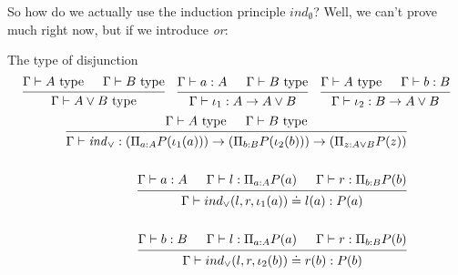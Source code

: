 \documentclass[a4paper, 12pt]{article}
\theoremstyle{changedot}
\theoremstyle{changedotbreak}
\theoremstyle{nonumberplain}
\begin{document}
So how do we actually use the induction principle $\mathit{ind}_{\emptyset}$? Well, we can't prove much right now, but if we introduce \textit{or}:

\begin{definition}
  The type of disjunction
\begin{align*}
  \begin{prooftree}
    \hypo{\Gamma \vdash A \text{ type}}
    \hypo{\Gamma \vdash B \text{ type}}
    \infer2{\Gamma \vdash A \lor B \text{ type}}
  \end{prooftree} & &
  \begin{prooftree}
    \hypo{\Gamma \vdash a : A}
    \hypo{\Gamma \vdash B \text{ type}}
    \infer2{\Gamma \vdash \iota_{1} : A \to A \lor B}
  \end{prooftree}
  &&
  \begin{prooftree}
    \hypo{\Gamma \vdash A \text{ type}}
    \hypo{\Gamma \vdash b : B}
    \infer2{\Gamma \vdash \iota_{2} : B \to A \lor B}
  \end{prooftree}
\end{align*}
\begin{align*}
  \begin{prooftree}
    \hypo{\Gamma \vdash A \text{ type}}
    \hypo{\Gamma \vdash B \text{ type}}
    \infer2{\Gamma \vdash \mathit{ind}_{\lor} : (\Pi_{a:A} P(\iota_{1}(a))) \to (\Pi_{b:B} P(\iota_{2}(b))) \to (\Pi_{z:A\lor B} P(z))}
  \end{prooftree}
  \\ \\
  \begin{prooftree}
    \hypo{\Gamma \vdash a : A}
    \hypo{\Gamma \vdash l : \Pi_{a:A}P(a)}
    \hypo{\Gamma \vdash r : \Pi_{b:B} P(b)}
    \infer3{\Gamma \vdash ind_{\lor}(l, r, \iota_{1}(a)) \doteq l(a) : P(a)}
  \end{prooftree} \\ \\
  \begin{prooftree}
    \hypo{\Gamma \vdash b : B}
    \hypo{\Gamma \vdash l : \Pi_{a:A}P(a)}
    \hypo{\Gamma \vdash r : \Pi_{b:B} P(b)}
    \infer3{\Gamma \vdash ind_{\lor}(l, r, \iota_{2}(b)) \doteq r(b) : P(b)}
  \end{prooftree}
\end{align*}
\end{definition}
\end{document}
